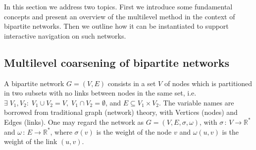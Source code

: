 \documentclass[runningheads]{llncs}
\begin{document}
In this section we address two topics. First we introduce some fundamental concepts and present an overview of the multilevel method in the context of bipartite networks. Then we outline how it can be instantiated to support interactive navigation  on such networks. 

\subsection{Multilevel coarsening of bipartite networks}\label{smul}
A bipartite network $G=(V,E)$ consists in a set $V$ of nodes which is partitioned in two subsets
with no links between nodes in the same set, i.e. $\exists\; V_1, V_2:\; V_1\cup V_2 = V,\;V_1\cap V_2 = \emptyset$, and $E\subseteq V_1 \times V_2$.
The variable names are borrowed from traditional
graph (network) theory, with Vertices (nodes) and Edges (links).
One may regard the network as $G=(V,E,\sigma,\omega)$, with
$\sigma\,:\,V\rightarrow \mathbb{R}^*$ and $\omega\,:\,E \rightarrow \mathbb{R}^*$,
where $\sigma(v)$ is the weight of the node $v$ and
$\omega(u,v)$ is the weight of the link $(u,v)$.




\end{document}
